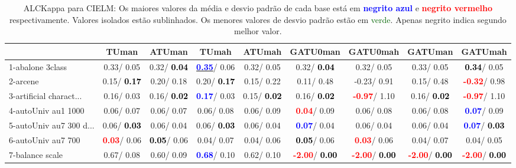 \begin{table}[h]
\caption{ALCKappa para CIELM: Os maiores valores da média e desvio padrão de cada base está em \textcolor{blue}{\textbf{negrito azul}} e \textcolor{red}{\textbf{negrito vermelho}} respectivamente. Valores isolados estão sublinhados. Os menores valores de desvio padrão estão em \textcolor{darkgreen}{verde}. Apenas negrito indica segundo melhor valor.}
\begin{center}\begin{tabular}{lc|c|c|c|c|c|c|c}
 & TUman & \textbf{ATUman} & TUmah & \textbf{ATUmah} & GATU0man & GATU0mah & GATUman & GATUmah\\ \hline 1-abalone 3class &   0.33/  0.05 &   0.32/\textcolor{black}{\textbf{  0.04}} & \underline{\textcolor{blue}{\textbf{  0.35}}}/  0.06 &   0.32/  0.05 &   0.32/\textcolor{black}{\textbf{  0.04}} &   0.32/  0.05 &   0.33/  0.05 & \textcolor{black}{\textbf{  0.34}}/  0.05 \\
2-arcene &   0.15/\textcolor{black}{\textbf{  0.17}} &   0.20/  0.18 &   0.20/\textcolor{black}{\textbf{  0.17}} &   0.15/  0.22 &   0.11/  0.48 &  -0.23/  0.91 &   0.15/  0.48 & \textcolor{red}{\textbf{ -0.32}}/  0.98 \\
3-artificial charact... &   0.16/  0.03 &   0.16/\textcolor{black}{\textbf{  0.02}} & \textcolor{blue}{\textbf{  0.17}}/  0.03 &   0.15/\textcolor{black}{\textbf{  0.02}} &   0.16/\textcolor{black}{\textbf{  0.02}} & \textcolor{red}{\textbf{ -0.97}}/  1.10 &   0.16/\textcolor{black}{\textbf{  0.02}} & \textcolor{red}{\textbf{ -0.97}}/  1.10 \\
4-autoUniv au1 1000 &   0.06/  0.07 &   0.06/  0.07 &   0.06/  0.08 &   0.06/  0.09 & \textcolor{red}{\textbf{  0.04}}/  0.09 &   0.06/  0.08 &   0.06/  0.08 & \textcolor{blue}{\textbf{  0.07}}/  0.09 \\
5-autoUniv au7 300 d... &   0.06/\textcolor{black}{\textbf{  0.03}} &   0.06/  0.04 &   0.06/\textcolor{black}{\textbf{  0.03}} &   0.06/  0.04 & \textcolor{blue}{\textbf{  0.07}}/  0.04 &   0.06/  0.04 &   0.06/  0.04 & \textcolor{blue}{\textbf{  0.07}}/\textcolor{black}{\textbf{  0.03}} \\
6-autoUniv au7 700 & \textcolor{red}{\textbf{  0.03}}/  0.06 & \textcolor{black}{\textbf{  0.05}}/  0.06 &   0.04/  0.07 &   0.04/  0.06 & \textcolor{black}{\textbf{  0.05}}/  0.06 & \textcolor{red}{\textbf{  0.03}}/  0.06 &   0.04/  0.07 &   0.04/  0.05 \\
7-balance scale &   0.67/  0.08 &   0.60/  0.09 & \textcolor{blue}{\textbf{  0.68}}/  0.10 &   0.62/  0.10 & \textcolor{red}{\textbf{ -2.00}}/\textcolor{black}{\textbf{  0.00}} & \textcolor{red}{\textbf{ -2.00}}/\textcolor{black}{\textbf{  0.00}} & \textcolor{red}{\textbf{ -2.00}}/\textcolor{black}{\textbf{  0.00}} & \textcolor{red}{\textbf{ -2.00}}/\textcolor{black}{\textbf{  0.00}} \\ \hline

\end{tabular}
\end{center}
\end{table}
